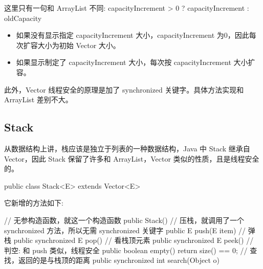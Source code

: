 这里只有一句和 ArrayList 不同: capacityIncrement > 0 ? capacityIncrement : oldCapacity
\begin{itemize}
    \item 如果没有显示指定 capacityIncrement 大小，capacityIncrement 为0，因此每次扩容大小为初始 Vector 大小。
    \item 如果显示制定了 capacityIncrement 大小，每次按 capacityIncrement 大小扩容。
\end{itemize}

此外，Vector 线程安全的原理是加了 synchronized 关键字。具体方法实现和 ArrayList 差别不大。

\subsection{Stack}

从数据结构上讲，栈应该是独立于列表的一种数据结构，Java 中 Stack 继承自 Vector，因此 Stack 保留了许多和 ArrayList，Vector 类似的性质，且是线程安全的。

\begin{Java}
public class Stack<E> extends Vector<E>
\end{Java}

它新增的方法如下:

\begin{Java}
// 无参构造函数，就这一个构造函数
public Stack()
// 压栈，就调用了一个 synchronized 方法，所以无需 synchronized 关键字
public E push(E item)
// 弹栈
public synchronized E pop()
// 看栈顶元素
public synchronized E peek()
// 判空: 和 push 类似，线程安全
public boolean empty()
    return size() == 0;
// 查找，返回的是与栈顶的距离
public synchronized int search(Object o)
\end{Java}

\newpage